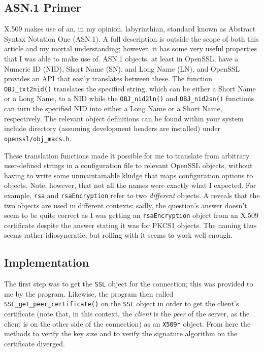 \documentclass{article}
\begin{document}
\subsection{ASN.1 Primer}
X.509 makes use of an, in my opinion, labyrinthian, standard known as Abstract Syntax Notation One (ASN.1).  A full description is outside the scope of both this article and my mortal understanding; however, it has some very useful properties that I was able to make use of.  ASN.1 objects, at least in OpenSSL, have a Numeric ID (NID), Short Name (SN), and Long Name (LN), and OpenSSL provides an API that easily translates between these.  The function \texttt{OBJ_txt2nid()} translates the specified string, which can be either a Short Name or a Long Name, to a NID while the \texttt{OBJ_nid2ln()} and \texttt{OBJ_nid2sn()} functions can turn the specified NID into either a Long Name or a Short Name, respectively.  The relevant object definitions can be found within your system include directory (assuming development headers are installed) under \texttt{openssl/obj_macs.h}.

These translation functions made it possible for me to translate from arbitrary user-defined strings in a configuration file to relevant OpenSSL objects, without having to write some unmaintainable kludge that maps configuration options to objects.  Note, however, that not all the names were exactly what I expected.  For example, \texttt{rsa} and \texttt{rsaEncryption} refer to two \emph{different} objects.  A  reveals that the two objects are used in different contexts; sadly, the question's answer doesn't seem to be quite correct as I was getting an \texttt{rsaEncryption} object from an X.509 certificate despite the answer stating it was for PKCS1 objects.  The naming thus seems rather idiosyncratic, but rolling with it seems to work well enough.

\subsection{Implementation}
The first step was to get the \texttt{SSL} object for the connection; this was provided to me by the program.  Likewise, the program then called \texttt{SSL_get_peer_certificate()} on the \texttt{SSL} object in order to get the client's certificate (note that, in this context, the \emph{client} is the \emph{peer} of the server, as the client is on the other side of the connection) as an \texttt{X509*} object.  From here the methods to verify the key size and to verify the signature algorithm on the certificate diverged.
\end{document}
